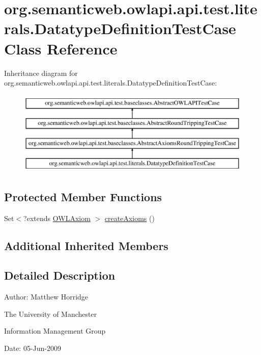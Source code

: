 \hypertarget{classorg_1_1semanticweb_1_1owlapi_1_1api_1_1test_1_1literals_1_1_datatype_definition_test_case}{\section{org.\-semanticweb.\-owlapi.\-api.\-test.\-literals.\-Datatype\-Definition\-Test\-Case Class Reference}
\label{classorg_1_1semanticweb_1_1owlapi_1_1api_1_1test_1_1literals_1_1_datatype_definition_test_case}
}
Inheritance diagram for org.\-semanticweb.\-owlapi.\-api.\-test.\-literals.\-Datatype\-Definition\-Test\-Case\-:\begin{figure}[H]
\begin{center}
\leavevmode
\includegraphics[height=4.000000cm]{classorg_1_1semanticweb_1_1owlapi_1_1api_1_1test_1_1literals_1_1_datatype_definition_test_case}
\end{center}
\end{figure}
\subsection*{Protected Member Functions}
\begin{DoxyCompactItemize}
\item 
Set$<$?extends \hyperlink{interfaceorg_1_1semanticweb_1_1owlapi_1_1model_1_1_o_w_l_axiom}{O\-W\-L\-Axiom} $>$ \hyperlink{classorg_1_1semanticweb_1_1owlapi_1_1api_1_1test_1_1literals_1_1_datatype_definition_test_case_a8f29a918375b023f67e89013754ce94d}{create\-Axioms} ()
\end{DoxyCompactItemize}
\subsection*{Additional Inherited Members}


\subsection{Detailed Description}
Author\-: Matthew Horridge\par
 The University of Manchester\par
 Information Management Group\par
 Date\-: 05-\/\-Jun-\/2009 

